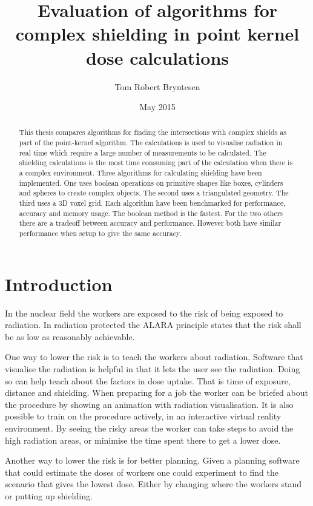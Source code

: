 \documentclass[11pt,twoside,a4paper]{report}
\begin{document}
\title{Evaluation of algorithms for complex shielding in point kernel dose calculations}
\author{Tom Robert Bryntesen}
\date{May 2015}
\maketitle

\begin{abstract}
This thesis compares algorithms for finding the intersections with complex shields as part of the point-kernel algorithm. The calculations is used to visualise radiation in real time which require a large number of measurements to be calculated. The shielding calculations is the most time consuming part of the calculation when there is a complex environment. Three algorithms for calculating shielding have been implemented. One uses boolean operations on primitive shapes like boxes, cylinders and spheres to create complex objects. The second uses a triangulated geometry. The third uses a 3D voxel grid. Each algorithm have been benchmarked for performance, accuracy and memory usage. The boolean method is the fastest. For the two others there are a tradeoff between accuracy and performance. However both have similar performance when setup to give the same accuracy.
\end{abstract}

\tableofcontents

\chapter{Introduction}
In the nuclear field the workers are exposed to the risk of being exposed to radiation. In radiation protected the ALARA principle states that the risk shall be as low as reasonably achievable. 

One way to lower the risk is to teach the workers about radiation. Software that visualise the radiation is helpful in that it lets the user see the radiation. Doing so can help teach about the factors in dose uptake. That is time of exposure, distance and shielding. When preparing for a job the worker can be briefed about the procedure by showing an animation with radiation visualisation. It is also possible to train on the procedure actively, in an interactive virtual reality environment. By seeing the risky areas the worker can take steps to avoid the high radiation areas, or minimise the time spent there to get a lower dose. 

Another way to lower the risk is for better planning. Given a planning software that could estimate the doses of workers one could experiment to find the scenario that gives the lowest dose. Either by changing where the workers stand or putting up shielding.
\end{document}
